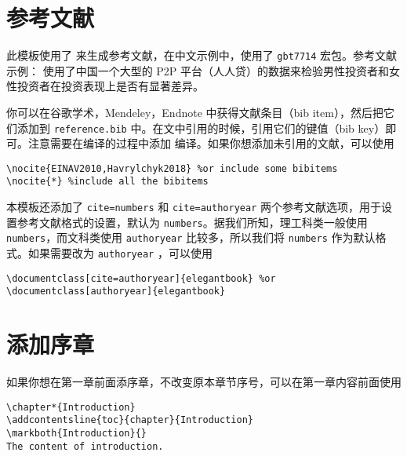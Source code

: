 \documentclass[cn,11pt]{elegantbook}
\begin{document}
\section{参考文献}

此模板使用了  来生成参考文献，在中文示例中，使用了 \lstinline{gbt7714} 宏包。参考文献示例：\cite{en1,en2,en3} 使用了中国一个大型的 P2P 平台（人人贷）的数据来检验男性投资者和女性投资者在投资表现上是否有显著差异。

你可以在谷歌学术，Mendeley，Endnote 中获得文献条目（bib item），然后把它们添加到 \lstinline{reference.bib} 中。在文中引用的时候，引用它们的键值（bib key）即可。注意需要在编译的过程中添加  编译。如果你想添加未引用的文献，可以使用
\begin{lstlisting}[frame=single]
\nocite{EINAV2010,Havrylchyk2018} %or include some bibitems
\nocite{*} %include all the bibitems
\end{lstlisting}

本模板还添加了 \lstinline{cite=numbers} 和 \lstinline{cite=authoryear} 两个参考文献选项，用于设置参考文献格式的设置，默认为 \lstinline{numbers}。据我们所知，理工科类一般使用 \lstinline{numbers}，而文科类使用 \lstinline{authoryear} 比较多，所以我们将 \lstinline{numbers} 作为默认格式。如果需要改为  \lstinline{authoryear} ，可以使用
\begin{lstlisting}
\documentclass[cite=authoryear]{elegantbook} %or
\documentclass[authoryear]{elegantbook}
\end{lstlisting}

\section{添加序章}

如果你想在第一章前面添序章，不改变原本章节序号，可以在第一章内容前面使用 
\begin{lstlisting}
\chapter*{Introduction}
\addcontentsline{toc}{chapter}{Introduction} 
\markboth{Introduction}{} 
The content of introduction.
\end{lstlisting}
\end{document}
